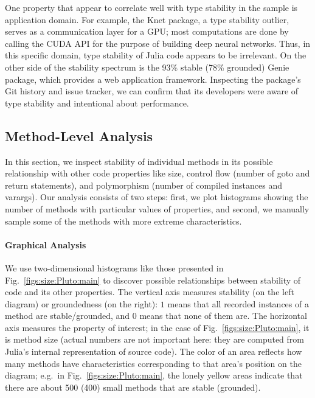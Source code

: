 \documentclass[oneside,openright,titlepage,numbers=noenddot,%
headinclude,footinclude,cleardoublepage=empty,abstract=on,
BCOR=5mm,paper=a4,fontsize=11pt,
dvipsnames
]{scrreprt}
\begin{document}
One property that appear to correlate well with type stability in the sample is
application domain. For example, the Knet package, a type stability outlier,
serves as a communication layer for a GPU; most computations are done by calling
the CUDA API for the purpose of building deep neural networks. Thus, in this
specific domain, type stability of Julia code appears to be irrelevant. On the
other side of the stability spectrum is the 93\% stable (78\% grounded) Genie
package, which provides a web application framework. Inspecting the package's
Git history and issue tracker, we can confirm that its developers were aware of
type stability and intentional about performance.


\subsection{Method-Level Analysis}


In this section, we inspect stability of individual methods in its possible
relationship with other code properties like size, control flow (number of goto
and return statements), and polymorphism (number of compiled instances and varargs).
Our analysis consists of two steps: first, we plot histograms
showing the number of methods with particular values of properties, and second,
we manually sample some of the methods with more extreme characteristics.

\paragraph{Graphical Analysis}\label{sssect:graphs}

We use two-dimensional histograms like those presented in
Fig.~\ref{figs:size:Pluto:main} to discover possible relationships between stability
of code and its other properties. The vertical axis measures stability (on the
left diagram) or groundedness (on the right): $1$ means that all recorded
instances of a method are stable/grounded, and $0$ means that none of them are.
The horizontal axis measures the property of interest; in the case of
Fig.~\ref{figs:size:Pluto:main}, it is method size (actual numbers are not
important here: they are computed from Julia's internal representation of source
code). The color of an area reflects how many methods have characteristics
corresponding to that area's position on the diagram; e.g.\ in
Fig.~\ref{figs:size:Pluto:main}, the lonely yellow areas indicate that there are about
500 (400) small methods that are stable (grounded).
\end{document}
